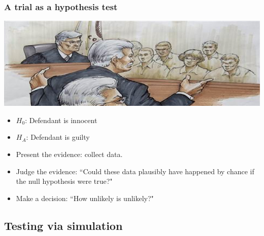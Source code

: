 \documentclass[slidestop,compress,mathserif,11pt,t,professionalfonts,xcolor=table]{beamer}
\begin{document}

\begin{frame}
\frametitle{A trial as a hypothesis test}

\begin{center}
\includegraphics[width=\textwidth]{figures/trial}
\end{center}

\begin{itemize}

\item $H_0$: Defendant is innocent 

\item $H_A$: Defendant is guilty

\item Present the evidence: collect data.

\item Judge the evidence: ``Could these data plausibly have happened by chance if the null hypothesis were true?"

\item Make a decision: ``How unlikely is unlikely?"

\end{itemize}

\end{frame}


\subsection{Testing via simulation}

\end{document}
